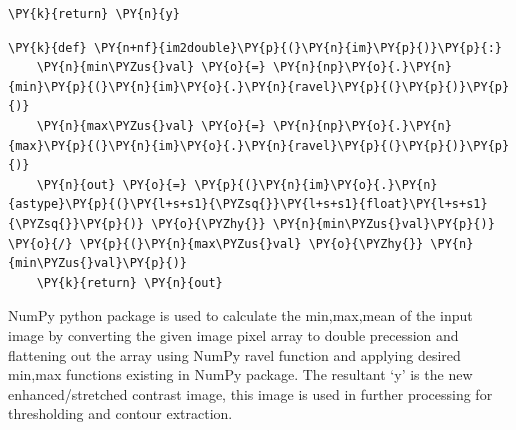 \begin{tcolorbox}[breakable, size=fbox, boxrule=1pt, pad at break*=1mm,colback=cellbackground, colframe=cellborder]
\begin{Verbatim}[commandchars=\\\{\}]
    \PY{k}{return} \PY{n}{y}
	\end{Verbatim}
\end{tcolorbox}

\begin{tcolorbox}[breakable, size=fbox, boxrule=1pt, pad at break*=1mm,colback=cellbackground, colframe=cellborder]
	\begin{Verbatim}[commandchars=\\\{\}]
\PY{k}{def} \PY{n+nf}{im2double}\PY{p}{(}\PY{n}{im}\PY{p}{)}\PY{p}{:}
    \PY{n}{min\PYZus{}val} \PY{o}{=} \PY{n}{np}\PY{o}{.}\PY{n}{min}\PY{p}{(}\PY{n}{im}\PY{o}{.}\PY{n}{ravel}\PY{p}{(}\PY{p}{)}\PY{p}{)}
    \PY{n}{max\PYZus{}val} \PY{o}{=} \PY{n}{np}\PY{o}{.}\PY{n}{max}\PY{p}{(}\PY{n}{im}\PY{o}{.}\PY{n}{ravel}\PY{p}{(}\PY{p}{)}\PY{p}{)}
    \PY{n}{out} \PY{o}{=} \PY{p}{(}\PY{n}{im}\PY{o}{.}\PY{n}{astype}\PY{p}{(}\PY{l+s+s1}{\PYZsq{}}\PY{l+s+s1}{float}\PY{l+s+s1}{\PYZsq{}}\PY{p}{)} \PY{o}{\PYZhy{}} \PY{n}{min\PYZus{}val}\PY{p}{)} \PY{o}{/} \PY{p}{(}\PY{n}{max\PYZus{}val} \PY{o}{\PYZhy{}} \PY{n}{min\PYZus{}val}\PY{p}{)}
    \PY{k}{return} \PY{n}{out}
	\end{Verbatim}
\end{tcolorbox}

NumPy python package is used to calculate the min,max,mean of the input
image by converting the given image pixel array to double precession and
flattening out the array using NumPy ravel function and applying desired
min,max functions existing in NumPy package. The resultant `y' is the
new enhanced/stretched contrast image, this image is used in further
processing for thresholding and contour extraction.


